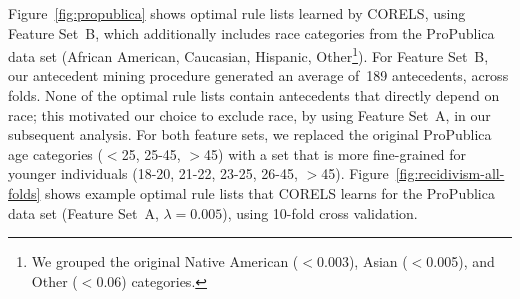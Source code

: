 \documentclass[twoside,11pt]{article}
\def\Reg{{\lambda}}
\begin{document}
Figure~\ref{fig:propublica} shows optimal rule lists learned by CORELS,
using Feature Set~B, which additionally includes race categories from the ProPublica data set (African American, Caucasian, Hispanic,
Other\footnote{We grouped the original Native American ($<$0.003), Asian ($<$0.005), and Other ($<$0.06) categories.}).
%
For Feature Set~B, our antecedent mining procedure generated an average
of~189 antecedents, across folds.
%
None of the optimal rule lists contain antecedents that directly depend on race;
this motivated our choice to exclude race, by using Feature Set~A, in our subsequent analysis.
%
For both feature sets, we replaced the original ProPublica age categories ($<$25, 25-45, $>$45)
with a set that is more fine-grained for younger individuals (18-20, 21-22, 23-25, 26-45, $>$45).
%
Figure~\ref{fig:recidivism-all-folds} shows example optimal rule lists that CORELS learns
for the ProPublica data set (Feature Set~A, ${\Reg = 0.005}$), using 10-fold cross validation.
\end{document}
